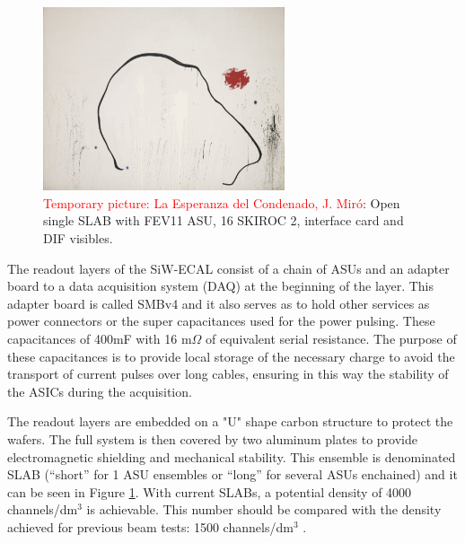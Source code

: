 \documentclass[a4paper,11pt]{article}
\newcommand{\todo}[1]{\textcolor{red}{{#1}}}
\begin{document}
\begin{figure}[!t]
  \centering
    \includegraphics[width=2.8in]{../figs/test.jpg} 
  \caption{\todo{Temporary picture: La Esperanza del Condenado, J. Miró}: Open single SLAB with FEV11 ASU, 16 SKIROC 2, interface card and DIF visibles. }
\label{ASU2}
\end{figure}

The readout layers of the SiW-ECAL consist of a chain of ASUs and an adapter board
to a data acquisition system (DAQ) at the beginning of the layer.
This adapter board is called SMBv4
and it also serves as to hold other services as power connectors or the super capacitances used for the power pulsing. 
These capacitances of 400mF with 16 m$\Omega$ of equivalent serial resistance. 
The purpose of these capacitances is to provide local storage 
of the necessary charge to avoid the transport of current pulses over long cables, 
ensuring in this way the stability of the ASICs during the acquisition.

The readout layers are embedded on a "U" shape carbon structure to protect the wafers.
The full system is then covered by two aluminum plates
to provide electromagnetic shielding and mechanical stability.
This ensemble is denominated SLAB
(``short'' for 1 ASU ensembles or ``long'' for several ASUs enchained) and it can be seen in
Figure \ref{ASU2}.
With current SLABs, a potential density of
4000 channels/dm$^{3}$ is achievable. This number should be compared with
the density achieved for previous beam tests: 1500 channels/dm$^{3}$ \cite{Amjad:2014tha}.
\end{document}
